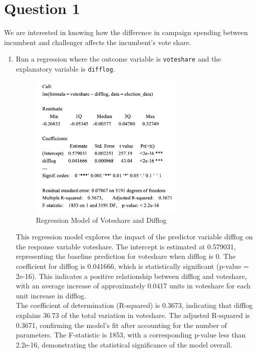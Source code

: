 \documentclass[12pt,letterpaper]{article}
\begin{document}
\section*{Question 1}
\vspace{.25cm}
\noindent We are interested in knowing how the difference in campaign spending between incumbent and challenger affects the incumbent's vote share. 
	\begin{enumerate}
		\item Run a regression where the outcome variable is \texttt{voteshare} and the explanatory variable is \texttt{difflog}.	\vspace{1cm}
		
		\begin{figure}[h!]
			\caption{\footnotesize{Regression Model of Voteshare and Difflog}}
			\vspace{.5cm}
			\centering
			\label{fig:1.1}
			\includegraphics[width=0.7\textwidth]{summary1.png}
		\end{figure}
		
		This regression model explores the impact of the predictor variable difflog on the response variable voteshare. The intercept is estimated at 0.579031, representing the baseline prediction for voteshare when difflog is 0. The coefficient for difflog is 0.041666, which is statistically significant (p-value = 2e-16). This indicates a positive relationship between difflog and voteshare, with an average increase of approximately 0.0417 units in voteshare for each unit increase in difflog.\\
		The coefficient of determination (R-squared) is 0.3673, indicating that difflog explains 36.73 of the total variation in voteshare. The adjusted R-squared is 0.3671, confirming the model's fit after accounting for the number of parameters. The F-statistic is 1853, with a corresponding p-value less than 2.2e-16, demonstrating the statistical significance of the model overall.\\
		

\end{enumerate}
\end{document}
